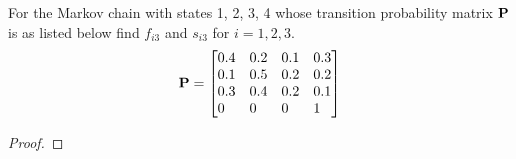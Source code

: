 \begin{problem}{4.63}
  For the Markov chain with states 1, 2, 3, 4 whose transition probability matrix
  $\bold{P}$ is as listed below find $f_{i3}$ and $s_{i3}$
  for $i=1, 2, 3$.
  \begin{align*}
    \bold{P} =
    \begin{bmatrix}
      0.4 & 0.2 & 0.1 & 0.3 \\
      0.1 & 0.5 & 0.2 & 0.2 \\
      0.3 & 0.4 & 0.2 & 0.1 \\
      0\phantom{.1} & 0\phantom{.1} & 0\phantom{.1} & 1\phantom{.1}
    \end{bmatrix}
  \end{align*}
\end{problem}

\begin{proof}
\end{proof}
\newpage
